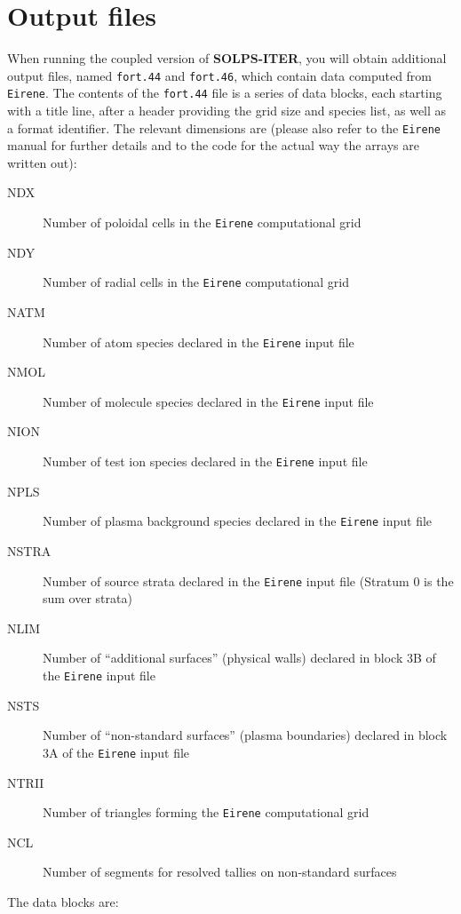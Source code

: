 \documentclass[a4paper,10pt]{report}
\newcommand\SOLPSITERns{{\bf SOLPS-ITER}}
\begin{document}
\section{Output files}

When running the coupled version of \SOLPSITERns, you will obtain additional output files, named {\tt fort.44} and {\tt fort.46}, which contain data computed from {\tt Eirene}. The contents of the {\tt fort.44} file is a series of data blocks, each starting with a title line, after a header providing the grid size and species list, as well as a format identifier. The relevant dimensions are (please also refer to the {\tt Eirene} manual for further details and to the code for the actual way the arrays are written out):

\begin{description}
  \item[NDX] Number of poloidal cells in the {\tt Eirene} computational grid
  \item[NDY] Number of radial cells in the {\tt Eirene} computational grid
  \item[NATM] Number of atom species declared in the {\tt Eirene} input file
  \item[NMOL] Number of molecule species declared in the {\tt Eirene} input file
  \item[NION] Number of test ion species declared in the {\tt Eirene} input file
  \item[NPLS] Number of plasma background species declared in the {\tt Eirene} input file
  \item[NSTRA] Number of source strata declared in the {\tt Eirene} input file (Stratum 0 is the sum over strata)
  \item[NLIM] Number of ``additional surfaces'' (physical walls) declared in block 3B of the {\tt Eirene} input file
  \item[NSTS] Number of ``non-standard surfaces'' (plasma boundaries) declared in block 3A of the {\tt Eirene} input file
  \item[NTRII] Number of triangles forming the {\tt Eirene} computational grid
  \item[NCL] Number of segments for resolved tallies on non-standard surfaces
\end{description}

The data blocks are:
\end{document}
